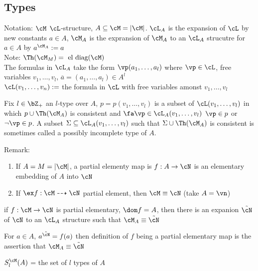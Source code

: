 
\subsection{Types}

Notation: $\cM$ $\cL$-structure, $A \subseteq \cM = | \cM|$. $\cL_A$ is the expansion of $\cL$ by new constants $a \in A$, $\cM_A$ is the expransion of $\cM_A$ to an $\cL_A$ strucutre for $a \in A$ by $a^{\cM_A} :=a$ \\
Note: $\Th(\cM_M)  = \text{ el diag}(\cM)$ \\
The formulas in $\cL_A$ take the form $\vp(a_1, \ldots, a_l)$ where $\vp \in \cL$, free variables $v_1, \ldots, v_l$, $\overline{a} = (a_1, \ldots, a_l) \in A^l$  \\
$\cL(v_1, \ldots, v_n) :=$ the formula in $\cL$ with free variables amonst $v_1, \ldots, v_l$ 

\begin{definition}
    Fix $l \in \bZ_+$ an $l$-type over $A$, $p = p(v_1, \ldots, v_l)$ is a subset of $\cL(v_1, \ldots, v_l)$ in which $p \cup \Th(\cM_A)$ is consistent and $\fa \vp \in \cL_A(v_1, \ldots, v_l)$ $\vp \in p$ or $\neg \vp \in p$. A subset $\Sigma \subseteq \cL_A(v_1, \ldots, v_l)$ such that $\Sigma \cup \Th(\cM_A)$ is consistent is sometimes called a possibly incomplete type of $A$.   
\end{definition}

Remark: 
\begin{enumerate}
    \item If $A= M = |\cM|$, a partial elementy map is $f: A \to \cN$ is an elementary embedding of $A$ into $\cN$
    \item If $\ex f: \cM \dashrightarrow \cN$ partial element, then $\cM \equiv \cN$ (take $A = \vn$) 
\end{enumerate}

\begin{proposition}
    if $f: \cM \to \cN$ is partial elementary, $\dom f = A$, then there is an expanion $\tilde{\cN}$ of $\cN$ to an $\cL_A$ structure such that $\cM_A \equiv \tilde{\cN}$ 
\end{proposition}

\begin{pf}
    For $a \in A$, $a^{\tilde{\cN}} = f(a)$ then definition of $f$ being a partial elementary map is the assertion that $\cM_A \equiv \tilde{\cN}$ 
\end{pf}

\begin{definition}
    $S_l^{\cM}(A)$ = the set of $l$ types of $A$
\end{definition}

